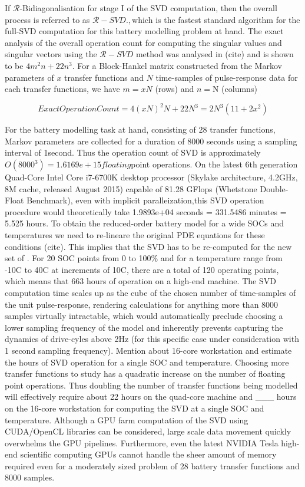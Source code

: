 If $\mathcal{R}$-Bidiagonalisation for stage I of the SVD computation,
then the overall process is referred to as $\mathcal{R}-SVD.,$which
is the fastest standard algorithm for the full-SVD computation for
this battery modelling problem at hand. The exact analysis of the
overall operation count for computing the singular values and singular
vectors using the $\mathcal{R}-SVD$ method was analysed in (cite)
and is shown to be $4m^{2}n+22n^{3}$. For a Block-Hankel matrix constructed
from the Markov parameters of $x$ transfer functions and $N$ time-samples
of pulse-response data for each transfer functions, we have $m=xN$
(rows) and $n=$N (columns)

\[
ExactOperationCount=4(xN)^{2}N+22N^{3}=2N^{3}(11+2x^{2})
\]

For the battery modelling task at hand, consisting of 28 transfer
functions, Markov parameters are collected for a duration of 8000
seconds using a sampling interval of 1second. Thus the operation count
of SVD is approximately $O(8000^{3})=1.6169e+15floating$point operations.
On the latest 6th generation Quad-Core Intel Core i7-6700K desktop
processor (Skylake architecture, 4.2GHz, 8M cache, released August
2015) capable of 81.28 GFlops (Whetstone Double-Float Benchmark),
even with implicit paralleization,this SVD operation procedure would
theoretically take 1.9893e+04 seconds = 331.5486 minutes = 5.525 hours.
To obtain the reduced-order battery model for a wide SOCs and temperatures
we need to re-lineare the original PDE equations for these conditions
(cite). This implies that the SVD has to be re-computed for the new
set of . For 20 SOC points from 0 to 100\% and for a temperature range
from -10C to 40C at increments of 10C, there are a total of 120 operating
points, which means that 663 hours of operation on a high-end machine.
The SVD computation time scales up as the cube of the chosen number
of time-samples of the unit pulse-response, rendering calculations
for anything more than 8000 samples virtually intractable, which would
automatically preclude choosing a lower sampling frequency of the
model and inherently prevents capturing the dynamics of drive-cyles
above 2Hz (for this specific case under consideration with 1 second
sampling frequency). Mention about 16-core workstation and estimate
the hours of SVD operation for a single SOC and temperature. Choosing
more transfer functions to study has a quadratic increase on the number
of floating point operations. Thus doubling the number of transfer
functions being modelled will effectively require about 22 hours on
the quad-core machine and \_\_\_ hours on the 16-core workstation
for computing the SVD at a single SOC and temperature. Although a
GPU farm computation of the SVD using CUDA/OpenCL libraries can be
considered, large scale data movement quickly overwhelms the GPU pipelines.
Furthermore, even the latest NVIDIA Tesla high-end scientific computing
GPUs cannot handle the sheer amount of memory required even for a
moderately sized problem of 28 battery transfer functions and 8000
samples.


